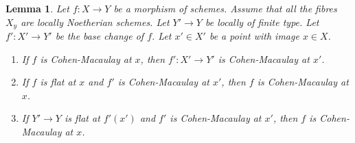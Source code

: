 \documentclass[10pt,a4paper]{amsart}
\theoremstyle{plain}
\newtheorem{lemma}[subsection]{Lemma}
\theoremstyle{definition}
\theoremstyle{remark}
\numberwithin{equation}{subsection}
\begin{document}
\begin{lemma}
\label{lemma-base-change-CM}
Let $f : X \to Y$ be a morphism of schemes.
Assume that all the fibres $X_y$ are locally Noetherian schemes.
Let $Y' \to Y$ be locally of finite type. Let $f' : X' \to Y'$
be the base change of $f$.
Let $x' \in X'$ be a point with image $x \in X$.
\begin{enumerate}
\item If $f$ is Cohen-Macaulay at $x$, then
$f' : X' \to Y'$ is Cohen-Macaulay at $x'$.
\item If $f$ is flat at $x$ and $f'$ is Cohen-Macaulay at $x'$, then $f$
is Cohen-Macaulay at $x$.
\item If $Y' \to Y$ is flat at $f'(x')$ and $f'$ is Cohen-Macaulay at
$x'$, then $f$ is Cohen-Macaulay at $x$.
\end{enumerate}
\end{lemma}
\end{document}
